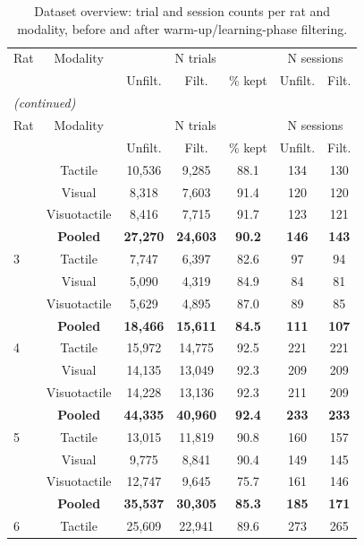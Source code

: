 \begin{longtable}{lcccccc}
\caption{Dataset overview: trial and session counts per rat and modality, before and after warm-up/learning-phase filtering.}
\label{tab:s1-dataset-overview} \\
\toprule
Rat & Modality & \multicolumn{3}{c}{N trials} & \multicolumn{2}{c}{N sessions} \\
 &  & Unfilt. & Filt. & \% kept & Unfilt. & Filt. \\
\midrule
\endfirsthead
\multicolumn{7}{l}{\textit{(continued)}} \\
\toprule
Rat & Modality & \multicolumn{3}{c}{N trials} & \multicolumn{2}{c}{N sessions} \\
 &  & Unfilt. & Filt. & \% kept & Unfilt. & Filt. \\
\midrule
\endhead
\bottomrule
\endfoot
\bottomrule
\endlastfoot
2 & Tactile & 10,536 & 9,285 & 88.1 & 134 & 130 \\
 & Visual & 8,318 & 7,603 & 91.4 & 120 & 120 \\
 & Visuotactile & 8,416 & 7,715 & 91.7 & 123 & 121 \\
\textbf{} & \textbf{Pooled} & \textbf{27,270} & \textbf{24,603} & \textbf{90.2} & \textbf{146} & \textbf{143} \\
3 & Tactile & 7,747 & 6,397 & 82.6 & 97 & 94 \\
 & Visual & 5,090 & 4,319 & 84.9 & 84 & 81 \\
 & Visuotactile & 5,629 & 4,895 & 87.0 & 89 & 85 \\
\textbf{} & \textbf{Pooled} & \textbf{18,466} & \textbf{15,611} & \textbf{84.5} & \textbf{111} & \textbf{107} \\
4 & Tactile & 15,972 & 14,775 & 92.5 & 221 & 221 \\
 & Visual & 14,135 & 13,049 & 92.3 & 209 & 209 \\
 & Visuotactile & 14,228 & 13,136 & 92.3 & 211 & 209 \\
\textbf{} & \textbf{Pooled} & \textbf{44,335} & \textbf{40,960} & \textbf{92.4} & \textbf{233} & \textbf{233} \\
5 & Tactile & 13,015 & 11,819 & 90.8 & 160 & 157 \\
 & Visual & 9,775 & 8,841 & 90.4 & 149 & 145 \\
 & Visuotactile & 12,747 & 9,645 & 75.7 & 161 & 146 \\
\textbf{} & \textbf{Pooled} & \textbf{35,537} & \textbf{30,305} & \textbf{85.3} & \textbf{185} & \textbf{171} \\
6 & Tactile & 25,609 & 22,941 & 89.6 & 273 & 265 \\

\end{longtable}
